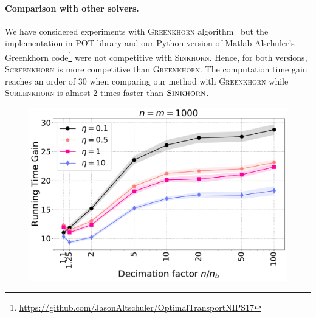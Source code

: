 {\paragraph{Comparison with other solvers.}

We have considered experiments with \textsc{Greenkhorn} algorithm~\cite{altschulernips17} but the implementation in POT library and our Python version of Matlab Alschuler's Greenkhorn code\footnote{\url{https://github.com/JasonAltschuler/OptimalTransportNIPS17}} were not competitive with \textsc{Sinkhorn}. Hence, for both versions, \textsc{Screenkhorn} is more competitive than \textsc{Greenkhorn}. The computation time gain reaches an order of $30$ when comparing our method with \textsc{Greenkhorn} while \textsc{Screenkhorn} is almost $2$ times faster than $\textsc{Sinkhorn}$. 
}

\begin{figure}[htbp]
	\centering
	\includegraphics[width=6.cm]{./figs/timegain_Screenkhorn_Greenkhorn.pdf}
	\caption{}
\end{figure}


